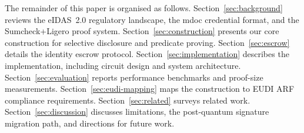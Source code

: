 The remainder of this paper is organised as follows.
Section~\ref{sec:background} reviews the eIDAS~2.0 regulatory landscape, the
mdoc credential format, and the Sumcheck+Ligero proof system.
Section~\ref{sec:construction} presents our core construction for selective
disclosure and predicate proving.
Section~\ref{sec:escrow} details the identity escrow protocol.
Section~\ref{sec:implementation} describes the implementation, including circuit
design and system architecture.
Section~\ref{sec:evaluation} reports performance benchmarks and proof-size
measurements.
Section~\ref{sec:eudi-mapping} maps the construction to EUDI ARF compliance
requirements.
Section~\ref{sec:related} surveys related work.
Section~\ref{sec:discussion} discusses limitations, the post-quantum signature
migration path, and directions for future work.

